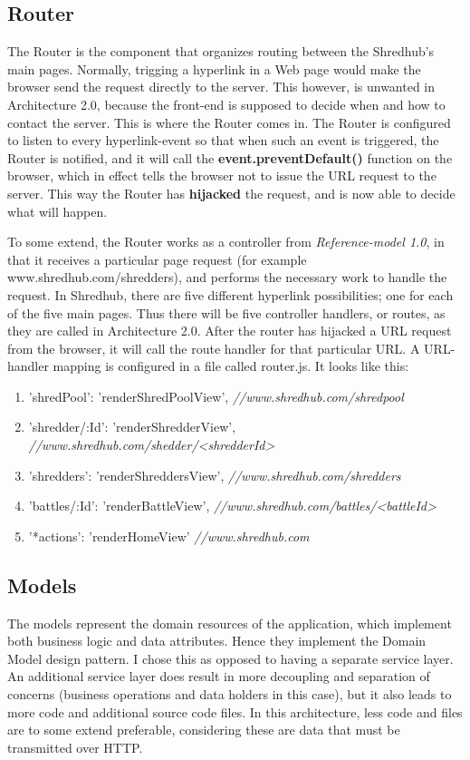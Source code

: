 \subsection{Router}
The Router is the component that organizes routing between the Shredhub's main pages. Normally, trigging a hyperlink in a Web page would make the browser send the request directly to the server. This however, is unwanted in Architecture 2.0, because the front-end is supposed to decide when and how to contact the server. This is where the Router comes in. The Router is configured to listen to every hyperlink-event so that when such an event is triggered, the Router is notified, and it will call the \textbf{event.preventDefault()} function on the browser, which in effect tells the browser not to issue the URL request to the server. This way the Router has \textbf{hijacked} the request, and is now able to decide what will happen.  

To some extend, the Router works as a controller from \textit{Reference-model 1.0}, in that it receives a particular page request (for example www.shredhub.com/shredders), and performs the necessary work to handle the request. In Shredhub, there are five different hyperlink possibilities; one for each of the five main pages. Thus there will be five controller handlers, or routes, as they are called in Architecture 2.0. After the router has hijacked a URL request from the browser, it will call the route handler for that particular URL. A URL-handler mapping is configured in a file called router.js. It looks like this:

\begin{enumerate}
\item{} 'shredPool': 	'renderShredPoolView', \textit{//www.shredhub.com/shredpool}
\item{} 'shredder/:Id':	'renderShredderView', \textit{//www.shredhub.com/shedder/<shredderId>}
\item{} 'shredders': 	'renderShreddersView', \textit{//www.shredhub.com/shredders}
\item{} 'battles/:Id':	'renderBattleView', \textit{//www.shredhub.com/battles/<battleId>}
\item{} '*actions':	'renderHomeView' \textit{ //www.shredhub.com}
\end{enumerate}

\subsection{Models}
The models represent the domain resources of the application, which implement both business logic and data attributes. Hence they implement the Domain Model design pattern. I chose this as opposed to having a separate service layer. An additional service layer does result in more decoupling and separation of concerns (business operations and data holders in this case), but it also leads to more code and additional source code files. In this architecture, less code and files are to some extend preferable, considering these are data that must be transmitted over HTTP.

